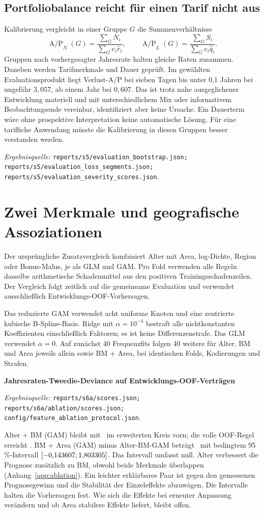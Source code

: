 \documentclass[11pt,a4paper]{article}
\newcommand{\evidence}[1]{\par{\footnotesize\textit{Ergebnisquelle:} \nolinkurl{#1}.}\par}
\begin{document}
\subsection*{Portfoliobalance reicht für einen Tarif nicht aus}
Kalibrierung vergleicht in einer Gruppe $G$ die Summenverhältnisse
\begin{equation}
 \operatorname{A/P}_N(G)=\frac{\sum_G N_i}{\sum_Ge_i\widehat r_i},\qquad
 \operatorname{A/P}_L(G)=\frac{\sum_G S_i}{\sum_Ge_i\widehat q_i}.
\end{equation}
Gruppen nach vorhergesagter Jahresrate halten gleiche Raten zusammen. Daneben werden Tarifmerkmale und Dauer geprüft. Im gewählten Evaluationsprodukt liegt Verlust-A/P bei sieben Tagen bis unter 0,1 Jahren bei ungefähr $3{,}057$, ab einem Jahr bei $0{,}607$. Das ist trotz nahe ausgeglichener Entwicklung materiell und mit unterschiedlichem Mix oder informativem Beobachtungsende vereinbar, identifiziert aber keine Ursache. Ein Dauerterm wäre ohne prospektive Interpretation keine automatische Lösung. Für eine tarifliche Anwendung müsste die Kalibrierung in diesen Gruppen besser verstanden werden.
\evidence{reports/s5/evaluation_bootstrap.json; reports/s5/evaluation_loss_segments.json; reports/s5/evaluation_severity_scores.json}

\clearpage
\section{Zwei Merkmale und geografische Assoziationen}\label{sec:reduced}
Der ursprüngliche Zusatzvergleich kombiniert Alter mit Area, log-Dichte, Region oder Bonus-Malus, je als GLM und GAM. Pro Fold verwenden alle Regeln dasselbe arithmetische Schadenmittel aus den positiven Trainingsschadenzeilen. Der Vergleich folgt zeitlich auf die gemeinsame Evaluation und verwendet ausschließlich Entwicklungs-OOF-Vorhersagen.

Das reduzierte GAM verwendet acht uniforme Knoten und eine zentrierte kubische B-Spline-Basis. Ridge mit $\alpha=10^{-4}$ bestraft alle nichtkonstanten Koeffizienten einschließlich Faktoren; es ist keine Differenzenstrafe. Das GLM verwendet $\alpha=0$. Auf zunächst 40 Frequenzfits folgen 40 weitere für Alter, BM und Area jeweils allein sowie BM + Area, bei identischen Folds, Kodierungen und Strafen.

\noindent\textbf{Jahresraten-Tweedie-Deviance auf Entwicklungs-OOF-Verträgen}
\begin{center}\small\ReducedTable\end{center}
\evidence{reports/s6a/scores.json; reports/s6a/ablation/scores.json; config/feature_ablation_protocol.json}
Alter + BM (GAM) bleibt mit \ExpandedScore\ im erweiterten Kreis vorn; die volle OOF-Regel erreicht \FullScore. BM + Area (GAM) minus Alter-BM-GAM beträgt \ExpandedDifference\ mit bedingtem 95\,\%-Intervall $[-0{,}143607;1{,}803305]$. Das Intervall umfasst null. Alter verbessert die Prognose zusätzlich zu BM, obwohl beide Merkmale überlappen (Anhang~\ref{app:ablation}). Ein leichter erklärbares Paar ist gegen den gemessenen Prognosegewinn und die Stabilität der Einzeleffekte abzuwägen. Die Intervalle halten die Vorhersagen fest. Wie sich die Effekte bei erneuter Anpassung verändern und ob Area stabilere Effekte liefert, bleibt offen.
\end{document}
